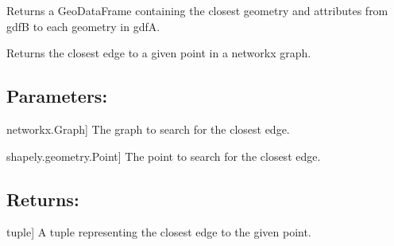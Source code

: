 \documentclass[letterpaper,10pt,english]{sphinxmanual}
\begin{document}
\begin{fulllineitems}
\label{\detokenize{pysewer:pysewer.helper.ckdnearest}}
\pysigstartsignatures
{}
\pysigstopsignatures
\sphinxAtStartPar
Returns a GeoDataFrame containing the closest geometry and attributes from gdfB to each geometry in gdfA.

\end{fulllineitems}


\begin{fulllineitems}
\label{\detokenize{pysewer:pysewer.helper.get_closest_edge}}
\pysigstartsignatures
{}
\pysigstopsignatures
\sphinxAtStartPar
Returns the closest edge to a given point in a networkx graph.


\subsection{Parameters:}
\label{\detokenize{pysewer:parameters}}\begin{description}
\sphinxlineitem{G}{[}networkx.Graph{]}
\sphinxAtStartPar
The graph to search for the closest edge.

\sphinxlineitem{point}{[}shapely.geometry.Point{]}
\sphinxAtStartPar
The point to search for the closest edge.

\end{description}


\subsection{Returns:}
\label{\detokenize{pysewer:returns}}\begin{description}
\sphinxlineitem{closest\_edge}{[}tuple{]}
\sphinxAtStartPar
A tuple representing the closest edge to the given point.

\end{description}

\end{fulllineitems}
\end{document}
